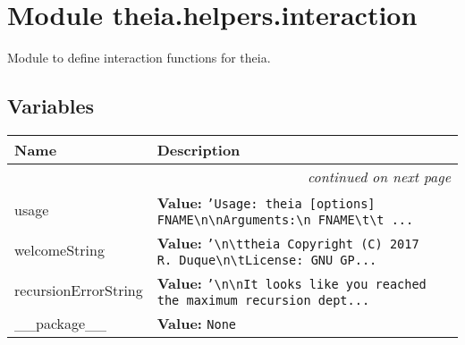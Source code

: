 %
%
%


\section{Module theia.helpers.interaction}

    \label{theia:helpers:interaction}
Module to define interaction functions for theia.



  \subsection{Variables}

    \vspace{-1cm}
\hspace{\varindent}\begin{longtable}{|p{\varnamewidth}|p{\vardescrwidth}|l}
\cline{1-2}
\cline{1-2} \centering \textbf{Name} & \centering \textbf{Description}& \\
\cline{1-2}
\endhead\cline{1-2}\multicolumn{3}{r}{\small\textit{continued on next page}}\\\endfoot\cline{1-2}
\endlastfoot\raggedright u\-s\-a\-g\-e\- & \raggedright \textbf{Value:} 
{\tt \texttt{'}\texttt{Usage: theia [options] FNAME{\textbackslash}n{\textbackslash}nArguments:{\textbackslash}n  FNAME{\textbackslash}t{\textbackslash}t }\texttt{...}}&\\
\cline{1-2}
\raggedright w\-e\-l\-c\-o\-m\-e\-S\-t\-r\-i\-n\-g\- & \raggedright \textbf{Value:} 
{\tt \texttt{'}\texttt{{\textbackslash}n{\textbackslash}ttheia Copyright (C) 2017 R. Duque{\textbackslash}n{\textbackslash}tLicense: GNU GP}\texttt{...}}&\\
\cline{1-2}
\raggedright r\-e\-c\-u\-r\-s\-i\-o\-n\-E\-r\-r\-o\-r\-S\-t\-r\-i\-n\-g\- & \raggedright \textbf{Value:} 
{\tt \texttt{'}\texttt{{\textbackslash}n{\textbackslash}nIt looks like you reached the maximum recursion dept}\texttt{...}}&\\
\cline{1-2}
\raggedright \_\-\_\-p\-a\-c\-k\-a\-g\-e\-\_\-\_\- & \raggedright \textbf{Value:} 
{\tt None}&\\
\cline{1-2}
\end{longtable}

